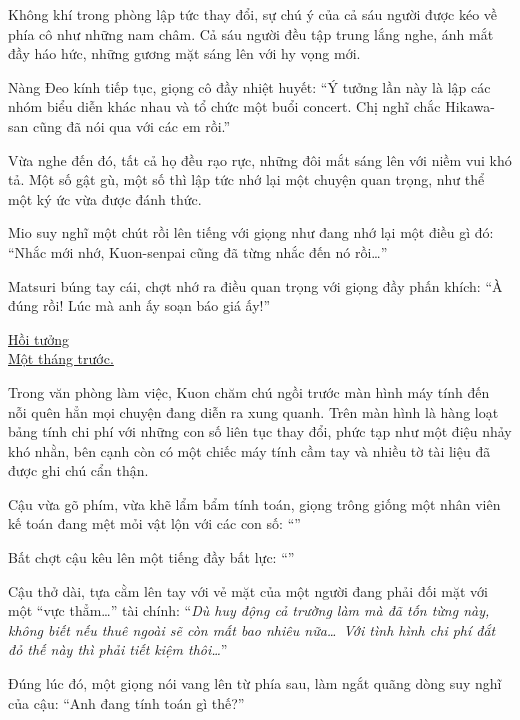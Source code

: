 \documentclass[../main.tex]{subfiles}
\begin{document}
Không khí trong phòng lập tức thay đổi, sự chú ý của cả sáu người được kéo về phía cô như những nam châm. Cả sáu người đều tập trung lắng nghe, ánh mắt đầy háo hức, những gương mặt sáng lên với hy vọng mới.

Nàng Đeo kính tiếp tục, giọng cô đầy nhiệt huyết: ``Ý tưởng lần này là lập các nhóm biểu diễn khác nhau và tổ chức một buổi concert. Chị nghĩ chắc Hikawa-san cũng đã nói qua với các em rồi.''

Vừa nghe đến đó, tất cả họ đều rạo rực, những đôi mắt sáng lên với niềm vui khó tả. Một số gật gù, một số thì lập tức nhớ lại một chuyện quan trọng, như thể một ký ức vừa được đánh thức.

Mio suy nghĩ một chút rồi lên tiếng với giọng như đang nhớ lại một điều gì đó: ``Nhắc mới nhớ, Kuon-senpai cũng đã từng nhắc đến nó rồi\dots''

Matsuri búng tay cái, chợt nhớ ra điều quan trọng với giọng đầy phấn khích: ``À đúng rồi! Lúc mà anh ấy soạn báo giá ấy!''

\begin{center}
  \uline{Hồi tưởng\\Một tháng trước.}
\end{center}

Trong văn phòng làm việc, Kuon chăm chú ngồi trước màn hình máy tính đến nỗi quên hẳn mọi chuyện đang diễn ra xung quanh. Trên màn hình là hàng loạt bảng tính chi phí với những con số liên tục thay đổi, phức tạp như một điệu nhảy khó nhằn, bên cạnh còn có một chiếc máy tính cầm tay và nhiều tờ tài liệu đã được ghi chú cẩn thận.

Cậu vừa gõ phím, vừa khẽ lẩm bẩm tính toán, giọng trông giống một nhân viên kế toán đang mệt mỏi vật lộn với các con số: ``''

Bất chợt cậu kêu lên một tiếng đầy bất lực: ``''

Cậu thở dài, tựa cằm lên tay với vẻ mặt của một người đang phải đối mặt với một ``vực thẳm\dots'' tài chính: ``\textit{Dù huy động cả trường làm mà đã tốn từng này, không biết nếu thuê ngoài sẽ còn mất bao nhiêu nữa\dots\ Với tình hình chi phí đắt đỏ thế này thì phải tiết kiệm thôi\dots}''

Đúng lúc đó, một giọng nói vang lên từ phía sau, làm ngắt quãng dòng suy nghĩ của cậu: ``Anh đang tính toán gì thế?''
\end{document}
